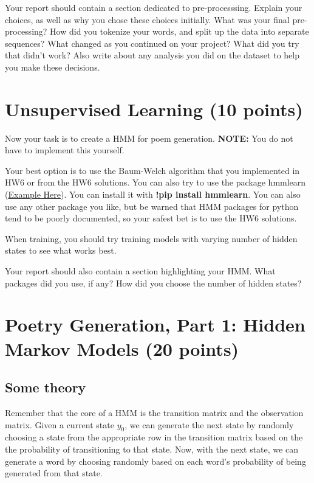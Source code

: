 \begin{report}

    Your report should contain a section dedicated to pre-processsing. Explain your choices, as well as why you chose these choices initially. What was your final pre-processing? How did you tokenize your words, and split up the data into separate sequences? What changed as you continued on your project? What did you try that didn't work? Also write about any analysis you did on the dataset to help you make these decisions.

\end{report}


\section{Unsupervised Learning (10 points)}

Now your task is to create a HMM for poem generation. \textbf{NOTE:} You do not have to implement this yourself.

Your best option is to use the Baum-Welch algorithm that you implemented in HW6 or from the HW6 solutions. You can also try to use the package hmmlearn (\href{https://hmmlearn.readthedocs.io/en/latest/tutorial.html}{Example Here}). You can install it with \textbf{!pip install hmmlearn}. You can also use any other package you like, but be warned that HMM packages for python tend to be poorly documented, so your safest bet is to use the HW6 solutions.

When training, you should try training models with varying number of hidden states to see what works best.

\begin{report}

    Your report should also contain a section highlighting your HMM. What packages did you use, if any? How did you choose the number of hidden states? \newline
\end{report}

\section{Poetry Generation, Part 1: Hidden Markov Models (20 points)}
\subsection{Some theory}
Remember that the core of a HMM is the transition matrix and the observation matrix. Given a current state $y_0$, we can generate the next state by randomly choosing a state from the appropriate row in the transition matrix based on the the probability of transitioning to that state. Now, with the next state, we can generate a word by choosing randomly based on each word's probability of being generated from that state.
